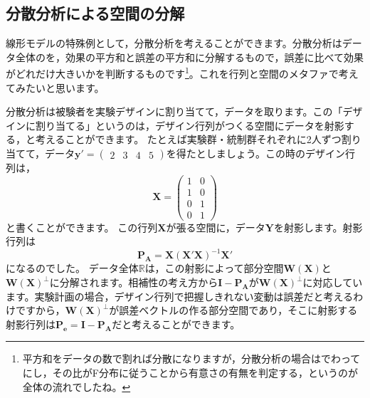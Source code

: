 \documentclass{ltjsbook}
\begin{document}
\subsection{分散分析による空間の分解}
線形モデルの特殊例として，分散分析を考えることができます。分散分析はデータ全体のを，効果の平方和と誤差の平方和に分解するもので，誤差に比べて効果がどれだけ大きいかを判断するものです\footnote{平方和をデータの数で割れば分散になりますが，分散分析の場合はでわってにし，その比がF分布に従うことから有意さの有無を判定する，というのが全体の流れでしたね。}。これを行列と空間のメタファで考えてみたいと思います。


分散分析は被験者を実験デザインに割り当てて，データを取ります。この「デザインに割り当てる」というのは，デザイン行列がつくる空間にデータを射影する，と考えることができます。
たとえば実験群・統制群それぞれに2人ずつ割り当てて，データ$\bm{y}'=\begin{pmatrix}2 & 3 & 4 & 5\end{pmatrix}$を得たとしましょう。この時のデザイン行列は，
\[ \bm{X} = \begin{pmatrix}1&0\\1&0\\ 0&1\\0&1\end{pmatrix} \]
と書くことができます。
この行列$\bm{X}$が張る空間に，データ$\bm{Y}$を射影します。射影行列は
\[ \bm{P_A} = \bm{X}(\bm{X}'\bm{X})^{-1}\bm{X}' \]
になるのでした。
データ全体$\mathbb{R}$は，この射影によって部分空間$\bm{W(X)}$と$\bm{W(X)}^{\perp}$に分解されます。相補性の考え方から$\bm{I}-\bm{P_A}$が$\bm{W(X)}^{\perp}$に対応しています。実験計画の場合，デザイン行列で把握しきれない変動は誤差だと考えるわけですから，$\bm{W(X)}^{\perp}$が誤差ベクトルの作る部分空間であり，そこに射影する射影行列は$\bm{P_e}=\bm{I}-\bm{P_A}$だと考えることができます。
\end{document}
